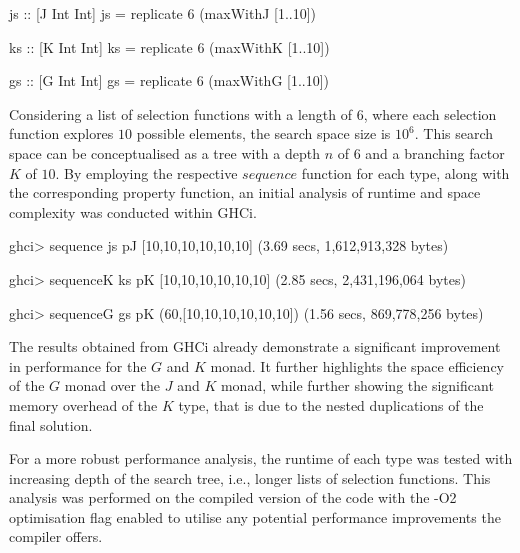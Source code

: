 \documentclass[runningheads]{llncs}
\begin{document}
\begin{code}
js :: [J Int Int]
js = replicate 6 (maxWithJ [1..10])

ks :: [K Int Int]
ks = replicate 6 (maxWithK [1..10])

gs :: [G Int Int]
gs = replicate 6 (maxWithG [1..10])
\end{code}

Considering a list of selection functions with a length of \(6\), where
each selection function explores \(10\) possible elements, the search
space size is \(10^6\). This search space can be conceptualised as a
tree with a depth \(n\) of \(6\) and a branching factor \(K\) of \(10\).
By employing the respective \(sequence\) function for each type, along
with the corresponding property function, an initial analysis of runtime
and space complexity was conducted within GHCi.

\begin{haskell}
ghci> sequence js pJ 
[10,10,10,10,10,10]
(3.69 secs, 1,612,913,328 bytes)

ghci> sequenceK ks pK
[10,10,10,10,10,10]
(2.85 secs, 2,431,196,064 bytes)

ghci> sequenceG gs pK
(60,[10,10,10,10,10,10])
(1.56 secs, 869,778,256 bytes)
\end{haskell}

The results obtained from GHCi already demonstrate a significant
improvement in performance for the \(G\) and \(K\) monad. It further
highlights the space efficiency of the \(G\) monad over the \(J\) and
\(K\) monad, while further showing the significant memory overhead of
the \(K\) type, that is due to the nested duplications of the final
solution.

\qquad For a more robust performance analysis, the runtime of each type
was tested with increasing depth of the search tree, i.e., longer lists
of selection functions. This analysis was performed on the compiled
version of the code with the -O2 optimisation flag enabled to utilise
any potential performance improvements the compiler offers.
\end{document}

